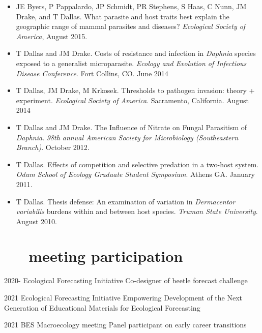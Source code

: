 \documentclass[]{CV}
\begin{document}
\begin{itemize}
\item JE Byers, P Pappalardo, JP Schmidt, PR Stephens, S Haas, C Nunn, JM Drake, and {\mefont T Dallas}. What parasite and host traits best explain the geographic range of mammal parasites and diseases? \textit{Ecological Society of America}, August  2015.

\item {\mefont T Dallas} and JM Drake. Costs of resistance and infection in \textit{Daphnia} species exposed to a generalist microparasite. \textit{Ecology and Evolution of Infectious Disease Conference}. Fort Collins, CO. June 2014

\item  {\mefont T Dallas}, JM Drake, M Krkosek. Thresholds to pathogen invasion: theory + experiment. \textit{Ecological Society of America}. Sacramento, California. August 2014

\item {\mefont T Dallas} and JM Drake. The Influence of Nitrate on Fungal Parasitism of \textit{Daphnia}. \textit{98th annual American Society for Microbiology (Southeastern Branch)}. October 2012.

\item {\mefont T Dallas}. Effects of competition and selective predation in a two-host system. \textit{Odum School of Ecology Graduate Student Symposium}. Athens GA. January 2011.

\item {\mefont T Dallas}. Thesis defense: An examination of variation in \textit{Dermacentor variabilis} burdens within and between host species. \textit{Truman State University}. August 2010.

\end{itemize}










\section{\faVideoCamera \ \ \ meeting participation}

\begin{entrylist}

  \entry
    {2020-}
		{Ecological Forecasting Initiative }
    {Co-designer of beetle forecast challenge}

  \entry
    {2021}
		{Ecological Forecasting Initiative}
    {Empowering Development of the Next Generation of Educational Materials for Ecological Forecasting}

  \entry
    {2021}
		{BES Macroecology meeting}
    {Panel participant on early career transitions}

\end{entrylist}
\end{document}
